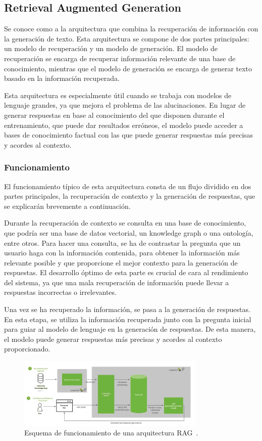 \subsection{Retrieval Augmented Generation}
Se conoce como  a la arquitectura que combina la recuperación de información con la generación de texto. Esta arquitectura se compone de dos partes principales: un modelo de recuperación y un modelo de generación. El modelo de recuperación se encarga de recuperar información relevante de una base de conocimiento, mientras que el modelo de generación se encarga de generar texto basado en la información recuperada.

Esta arquitectura es especialmente útil cuando se trabaja con modelos de lenguaje grandes, ya que mejora el problema de las alucinaciones. En lugar de generar respuestas en base al conocimiento del que disponen durante el entrenamiento, que puede dar resultados erróneos, el modelo puede acceder a bases de conocimiento factual con las que puede generar respuestas más precisas y acordes al contexto.

\subsubsection{Funcionamiento}
El funcionamiento típico de esta arquitectura consta de un flujo dividido en dos partes principales, la recuperación de contexto y la generación de respuestas, que se explicarán brevemente a continuación.

Durante la recuperación de contexto se consulta en una base de conocimiento, que podría ser una base de datos vectorial, un knowledge graph o una ontología, entre otros. Para hacer una consulta, se ha de contrastar la pregunta que un usuario haga con la información contenida, para obtener la información más relevante posible y que proporcione el mejor contexto para la generación de respuestas. El desarrollo óptimo de esta parte es crucial de cara al rendimiento del sistema, ya que una mala recuperación de información puede llevar a respuestas incorrectas o irrelevantes.

Una vez se ha recuperado la información, se pasa a la generación de respuestas. En esta etapa, se utiliza la información recuperada junto con la pregunta inicial para guiar al modelo de lenguaje en la generación de respuestas. De esta manera, el modelo puede generar respuestas más precisas y acordes al contexto proporcionado.

\begin{figure}[!h]
    \centering
    \includegraphics[width=0.8\textwidth]{images/rag.jpg}
    \caption{Esquema de funcionamiento de una arquitectura RAG~\cite{nvidiaBlog}.}
    \label{fig:rag}
\end{figure}